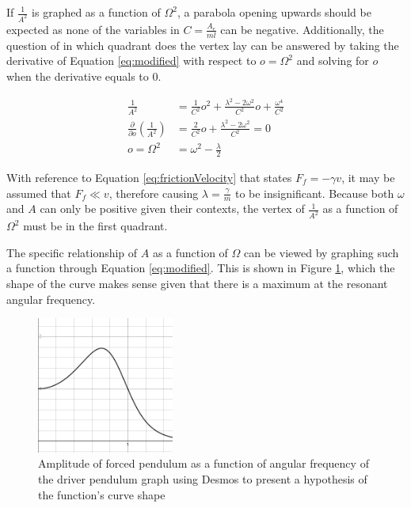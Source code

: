 \documentclass[letterpaper, 12pt]{article}
\begin{document}
If \(\frac{1}{A^2}\) is graphed as a function of \(\Omega^2\),
a parabola opening upwards should be expected as
none of the variables in
\(C = \frac{A_e}{ml}\) can be negative. Additionally,
the question of in which quadrant does the vertex lay can
be answered by taking the derivative of Equation \ref*{eq:modified}
with respect to \(o = \Omega^2\) and solving for \(o\) when
the derivative equals to 0.

\begin{align*}
    \frac{1}{A^2}                                           & = \frac{1}{C^2}o^2+ \frac{\lambda^2 - 2\omega^2}{C^2}o + \frac{\omega^4}{C^2}
    \\
    \frac{\partial}{\partial o}\left( \frac{1}{A^2} \right) & = \frac{2}{C^2}o + \frac{\lambda^2 - 2\omega^2}{C^2} = 0
    \\
    o = \Omega^2                                            & = \omega^2 - \frac{\lambda}{2}
\end{align*}

With reference to Equation \ref*{eq:frictionVelocity} that states
\(F_f = -\gamma v\), it may be assumed that \(F_f \ll v\),
therefore causing \(\lambda = \frac{\gamma}{m}\) to be
insignificant. Because both \(\omega\) and \(A\) can only
be positive given their contexts, the vertex of
\(\frac{1}{A^2}\) as a function of \(\Omega^2\)
must be in the first quadrant.

The specific relationship of \(A\) as a function of \(\Omega\)
can be viewed by graphing such a function through
Equation \ref*{eq:modified}. This is shown in Figure
\ref*{fig:hypothesis}, which the shape of the curve
makes sense given that there is a maximum
at the resonant angular frequency.

\begin{figure}[H]
    \centering
    \includegraphics[width=0.4\textwidth]{hypothesis.png}
    \caption{Amplitude of forced pendulum as a function of angular frequency of the driver pendulum graph using Desmos to present a hypothesis of the function's curve shape}
    \label{fig:hypothesis}
\end{figure}
\end{document}
